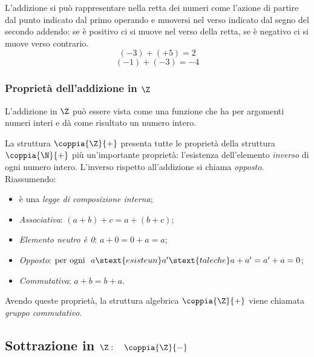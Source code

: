 L'addizione si può rappresentare nella retta dei numeri come l'azione di 
partire dal punto indicato dal primo operando e 
muoversi nel verso indicato dal segno del secondo addendo: 
se è positivo ci si muove nel verso della retta, 
se è negativo ci si muove verso contrario.
\[(-3)+(+5)=2\]
% 
  {\intaddlinea}
% 
\[ (-1)+(-3) = -4\]
% 
  {\intaddlineb}

\subsubsection{Proprietà dell'addizione in \texorpdfstring{$\Z$}{Z}}

L'addizione in \(\Z\) può essere vista come una funzione che ha per 
argomenti numeri interi e dà come risultato un numero intero.

La struttura \(\coppia{\Z}{+}\)\ind{\(\coppia{\Z}{+}\)} presenta tutte le 
proprietà della struttura \(\coppia{\N}{+}\) più un'importante proprietà:
l'esistenza dell'elemento \emph{inverso} di ogni numero 
intero.
L'inverso rispetto all'addizione si chiama \emph{opposto}.
Riassumendo:
\begin{itemize} [nosep]
 \item è una \emph{legge di composizione interna};
 \item \emph{Associativa}: \quad \((a + b) + c = a + (b + c)\);
 \item \emph{Elemento neutro è 0}: \quad \(a + 0 = 0 + a = a\);
 \item \emph{Opposto}: \quad 
 \(\text{per ogni~ } a \stext{ esiste un } a' \stext{ tale che }
 a + a' = a' + a = 0\);
 \item \emph{Commutativa}: \quad \(a + b = b + a\).
\end{itemize}

Avendo queste proprietà, la struttura algebrica \(\coppia{\Z}{+}\) viene 
chiamata \emph{gruppo commutativo}.


\subsection{Sottrazione in 
\texorpdfstring{$\Z: \quad \coppia{\Z}{-}$}{Z: (Z; -)}}
\indc{\(\Z\)}{\(\coppia{\Z}{-}\)}

